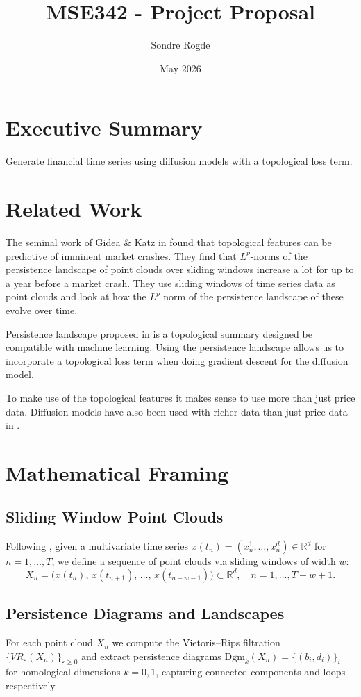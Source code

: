 \documentclass{article}
\title{MSE342 - Project Proposal}
\author{Sondre Rogde}
\date{May 2026}
\begin{document}
\maketitle

\section{Executive Summary}
Generate financial time series using diffusion models with a topological loss term. 

\section{Related Work}
The seminal work of Gidea \& Katz in \cite{Gidea_2018} found that topological features can be predictive of imminent market crashes. They find that $L^p$-norms of the persistence landscape of point clouds over sliding windows increase a lot for up to a year before a market crash. They use sliding windows of time series data as point clouds and look at how the $L^p$ norm of the persistence landscape of these evolve over time. 

Persistence landscape proposed in \cite{Bubenik_2015} is a topological summary designed be compatible with machine learning. Using the persistence landscape allows us to incorporate a topological loss term when doing gradient descent for the diffusion model.

To make use of the topological features it makes sense to use more than just price data. Diffusion models have also been used with richer data than just price data in \cite{Takahashi_2025}. 


\section{Mathematical Framing}

\subsection*{Sliding Window Point Clouds}
Following \cite{Gidea_2018}, given a multivariate time series $x(t_n) = (x_n^1, \dots, x_n^d) \in \mathbb{R}^d$ for $n = 1, \dots, T$, we define a sequence of point clouds via sliding windows of width $w$:
\[
    X_n = \bigl(x(t_n),\, x(t_{n+1}),\, \dots,\, x(t_{n+w-1})\bigr) \subset \mathbb{R}^d, \quad n = 1, \dots, T - w + 1.
\]

\subsection*{Persistence Diagrams and Landscapes}
For each point cloud $X_n$ we compute the Vietoris--Rips filtration $\{VR_\varepsilon(X_n)\}_{\varepsilon \geq 0}$ and extract persistence diagrams $\mathrm{Dgm}_k(X_n) = \{(b_i, d_i)\}_i$ for homological dimensions $k = 0, 1$, capturing connected components and loops respectively.
\end{document}
